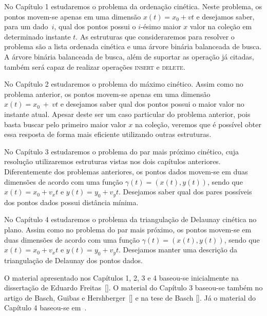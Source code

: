 No Capítulo 1 estudaremos o problema da ordenação cinética.
Neste problema, os pontos movem-se apenas em uma dimensão $x(t) = x_0 + vt$ e
desejamos saber, para um dado~$i$, qual dos pontos possui o $i$-ésimo maior $x$ valor na coleção em
determinado instante $t$.
As estruturas que consideraremos para resolver o problema são a lista
ordenada cinética e uma árvore binária balanceada de busca.
A árvore binária balanceada de busca, além de suportar as operação já citadas,
também será capaz de realizar operações \textsc{insert} e \textsc{delete}.

No Capítulo 2 estudaremos o problema do máximo cinético.
Assim como no problema anterior, os pontos movem-se apenas em uma
dimensão $x(t) = x_0~+~vt$ e desejamos saber qual dos pontos possui o maior valor
no instante atual.
Apesar deste ser um caso particular do problema anterior, pois basta buscar pelo primeiro
maior valor $x$ na coleção, veremos que é possível obter essa resposta de forma mais
eficiente utilizando outras estruturas.

No Capítulo 3 estudaremos o problema do par mais próximo cinético, cuja resolução
utilizaremos estruturas vistas nos dois capítulos anteriores.
Diferentemente dos problemas anteriores, os pontos dados movem-se em duas dimensões
de acordo com uma função $\gamma(t) = (x(t), y(t))$, sendo que $x(t) = x_0 + v_x t$ e
$y(t) = y_0 + v_y t$.
Desejamos saber qual dos pares possíveis dos pontos dados possui distância mínima.

No Capítulo 4 estudaremos o problema da triangulação de Delaunay cinética no plano.
Assim como no problema do par mais próximo, os pontos movem-se em duas dimensões de acordo com uma
função $\gamma(t) = (x(t), y(t))$, sendo que $x(t) = x_0 + v_x t$ e $y(t) = y_0 + v_y t$.
Desejamos manter uma descrição da triangulação de Delaunay dos pontos dados.

O material apresentado nos Capítulos 1, 2, 3 e 4 baseou-se inicialmente na dissertação de Eduardo
Freitas~[\cite{eduardo}].
O material do Capítulo 3 baseou-se também no artigo de Basch, Guibas e
Hershberger~[\cite{BASCH19991}] e na tese de Basch [\cite{basch-thesis}].
Já o material do Capítulo 4 baseou-se em~\cite{computationalgeometry}.


